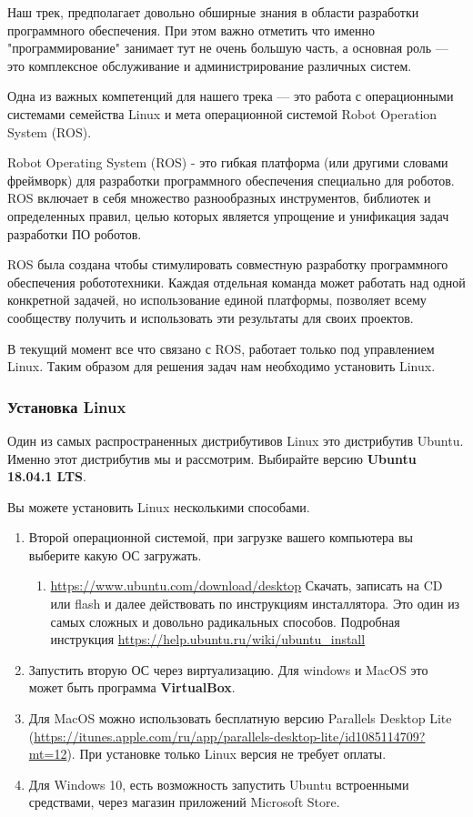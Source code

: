 Наш трек, предполагает довольно обширные знания в области разработки программного обеспечения. При этом важно отметить что именно "программирование" занимает тут не очень большую часть, а основная роль — это комплексное обслуживание и администрирование различных систем.

Одна из важных компетенций для нашего трека — это работа с операционными системами семейства Linux и мета операционной системой Robot Operation System (ROS).

Robot Operating System (ROS) - это гибкая платформа (или другими словами фреймворк) для разработки программного обеспечения специально для роботов. ROS включает в себя множество разнообразных инструментов, библиотек и определенных правил, целью которых является упрощение и унификация задач разработки ПО роботов.

ROS была создана чтобы стимулировать совместную разработку программного обеспечения робототехники. Каждая отдельная команда может работать над одной конкретной задачей, но использование единой платформы, позволяет всему сообществу получить и использовать эти результаты для своих проектов.

В текущий момент все что связано с ROS, работает только под управлением Linux. Таким образом для решения задач нам необходимо установить Linux.

\subsubsection*{Установка Linux}

Один из самых распространенных дистрибутивов Linux это дистрибутив Ubuntu. Именно этот дистрибутив мы и рассмотрим. Выбирайте версию \textbf{Ubuntu 18.04.1 LTS}.

Вы можете установить Linux несколькими способами.
\begin{enumerate}
    \item Второй операционной системой, при загрузке вашего компьютера вы выберите какую ОС загружать. 
    \begin{enumerate}
        \item \url{https://www.ubuntu.com/download/desktop} Скачать, записать на CD или flash и далее действовать по инструкциям инсталлятора. Это один из самых сложных и довольно радикальных способов. Подробная инструкция \url{https://help.ubuntu.ru/wiki/ubuntu_install}
    \end{enumerate}
    \item Запустить вторую ОС через виртуализацию. Для windows и MacOS это может быть программа \textbf{VirtualBox}.
    \item Для MacOS можно использовать бесплатную версию Parallels Desktop Lite (\url{https://itunes.apple.com/ru/app/parallels-desktop-lite/id1085114709?mt=12}). При установке только Linux версия не требует оплаты.
    \item Для Windows 10, есть возможность запустить Ubuntu встроенными средствами, через магазин приложений Microsoft Store.
\end{enumerate}

